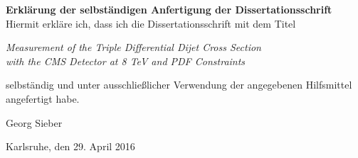 \cleardoublepage
\thispagestyle{empty}
\null\vspace{10cm}
\noindent
{\sffamily \textbf{Erklärung der selbständigen Anfertigung der
Dissertationsschrift}}\\[1cm]

\noindent
Hiermit erkläre ich, dass ich die Dissertationsschrift mit dem Titel
%
\begin{center}
 \guillemotright
 \textit{Measurement of the Triple Differential Dijet Cross Section\\
            with the CMS Detector at 8 TeV and PDF Constraints}\guillemotleft\\[1.5ex]

\end{center}
%
selbständig und unter ausschließlicher Verwendung der angegebenen Hilfsmittel\\
angefertigt habe.

\vspace{12ex}
\hrulefill\hspace{8cm}

Georg Sieber

Karlsruhe, den 29. April 2016


